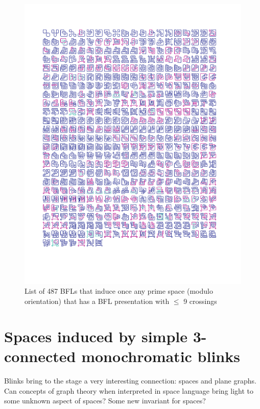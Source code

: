 \begin{figure}[h!tp]
   \begin{center}
      \leavevmode
      \includegraphics[width=15cm]{fig/primeSpace487RepresentantLinks.pdf}
   \end{center}
   \vspace{-0.7cm}
   \caption{ List of 487 BFLs that induce once any prime space (modulo orientation)
   that has a BFL presentation with $\leq$ 9 crossings}
   \label{fig:primeSpace487RepresentativeLinks}
\end{figure}

\newpage

\section{Spaces induced by simple 3-connected monochromatic blinks}

Blinks bring to the stage a very interesting connection: spaces and
plane graphs. Can concepts of graph theory when interpreted in space
language bring light to some unknown aspect of spaces? Some new
invariant for spaces?

